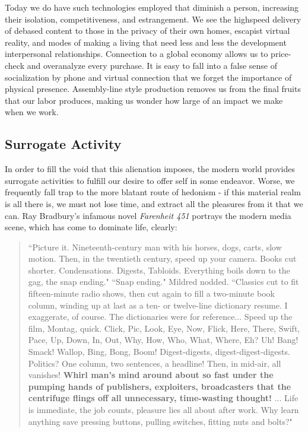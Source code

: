 \documentclass[letterpaper]{article}
\begin{document}

Today we do have such technologies employed that diminish a person, increasing their isolation, competitiveness, and estrangement. We see the highspeed delivery of debased content to those in the privacy of their own homes, escapist virtual reality, and modes of making a living that need less and less the development interpersonal relationships. Connection to a global economy allows us to price-check and overanalyze every purchase. It is easy to fall into a false sense of socialization by phone and virtual connection that we forget the importance of physical presence. Assembly-line style production removes us from the final fruits that our labor produces, making us wonder how large of an impact we make when we work.

\subsection{Surrogate Activity}

In order to fill the void that this alienation imposes, the modern world provides surrogate activities to fulfill our desire to offer self in some endeavor. Worse, we frequently fall trap to the more blatant route of hedonism - if this material realm is all there is, we must not lose time, and extract all the pleasures from it that we can. Ray Bradbury's infamous novel \textit{Farenheit 451} portrays the modern media scene, which has come to dominate life, clearly:

\begin{quote}
  ``Picture it. Nineteenth-century man with his horses, dogs, carts, slow motion. Then, in the twentieth century, speed up your camera. Books cut shorter. Condensations. Digests, Tabloids. Everything boils down to the gag, the snap ending." ``Snap ending." Mildred nodded. ``Classics cut to fit fifteen-minute radio shows, then cut again to fill a two-minute book column, winding up at last as a ten- or twelve-line dictionary resume. I exaggerate, of course. The dictionaries were for reference... Speed up the film, Montag, quick. Click, Pic, Look, Eye, Now, Flick, Here, There, Swift, Pace, Up, Down, In, Out, Why, How, Who, What, Where, Eh? Uh! Bang! Smack! Wallop, Bing, Bong, Boom! Digest-digests, digest-digest-digests. Politics? One column, two sentences, a headline! Then, in mid-air, all vanishes! \textbf{Whirl man’s mind around about so fast under the pumping hands of publishers, exploiters, broadcasters that the centrifuge flings off all unnecessary, time-wasting thought!} ... Life is immediate, the job counts, pleasure lies all about after work. Why learn anything save pressing buttons, pulling switches, fitting nuts and bolts?"
\end{quote}
\end{document}
